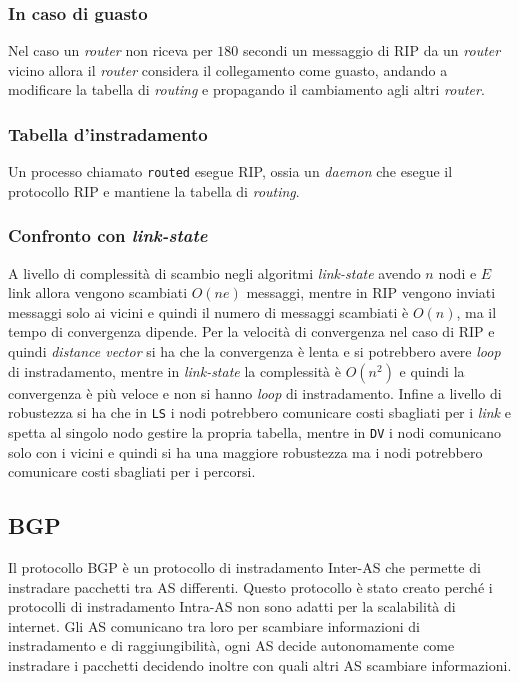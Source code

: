         \subsubsection{In caso di guasto}
            Nel caso un \textit{router} non riceva per $180$ secondi un messaggio di \Acrshort*{RIP} da un \textit{router} vicino allora il \textit{router} considera il collegamento come guasto, andando a modificare la tabella di \textit{routing} e propagando il cambiamento agli altri \textit{router}.
        \subsubsection{Tabella d'instradamento}
            Un processo chiamato \texttt{routed} esegue \Acrshort*{RIP}, ossia un \textit{daemon} che esegue il protocollo \Acrshort*{RIP} e mantiene la tabella di \textit{routing}. 
        \subsubsection{Confronto con \textit{link-state}}
            A livello di complessità di scambio negli algoritmi \textit{link-state} avendo $n$ nodi e $E$ link allora vengono scambiati $O(ne)$ messaggi, mentre in \Acrshort*{RIP} vengono inviati messaggi solo ai vicini e quindi il numero di messaggi scambiati è $O(n)$, ma il tempo di convergenza dipende.\newline
            Per la velocità di convergenza nel caso di \Acrshort*{RIP} e quindi \textit{distance vector} si ha che la convergenza è lenta e si potrebbero avere \textit{loop} di instradamento, mentre in \textit{link-state} la complessità è $O(n^2)$ e quindi la convergenza è più veloce e non si hanno \textit{loop} di instradamento.\newline
            Infine a livello di robustezza si ha che in \texttt{LS} i nodi potrebbero comunicare costi sbagliati per i \textit{link} e spetta al singolo nodo gestire la propria tabella, mentre in \texttt{DV} i nodi comunicano solo con i vicini e quindi si ha una maggiore robustezza ma i nodi potrebbero comunicare costi sbagliati per i percorsi.
    \subsection[\textit{Border Gateway Protocol} (\texttt{BGP})]{\acrfull*{BGP}}
        Il protocollo \Acrshort*{BGP} è un protocollo di instradamento Inter-\Acrshort*{AS} che permette di instradare pacchetti tra \Acrshort*{AS} differenti. Questo protocollo è stato creato perché i protocolli di instradamento Intra-\Acrshort*{AS} non sono adatti per la scalabilità di internet. Gli \Acrshort*{AS} comunicano tra loro per scambiare informazioni di instradamento e di raggiungibilità, ogni \Acrshort*{AS} decide autonomamente come instradare i pacchetti decidendo inoltre con quali altri \Acrshort*{AS} scambiare informazioni.
